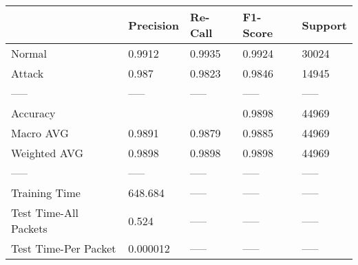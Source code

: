 \begin{tabular}{lllll}
\toprule
{} & Precision & Re-Call & F1-Score & Support \\
\midrule
Normal                &    0.9912 &  0.9935 &   0.9924 &   30024 \\
Attack                &     0.987 &  0.9823 &   0.9846 &   14945 \\
-----                 &     ----- &   ----- &    ----- &   ----- \\
Accuracy              &           &         &   0.9898 &   44969 \\
Macro AVG             &    0.9891 &  0.9879 &   0.9885 &   44969 \\
Weighted AVG          &    0.9898 &  0.9898 &   0.9898 &   44969 \\
-----                 &     ----- &   ----- &    ----- &   ----- \\
Training Time         &   648.684 &   ----- &    ----- &   ----- \\
Test Time-All Packets &     0.524 &   ----- &    ----- &   ----- \\
Test Time-Per Packet  &  0.000012 &   ----- &    ----- &   ----- \\
\bottomrule
\end{tabular}
